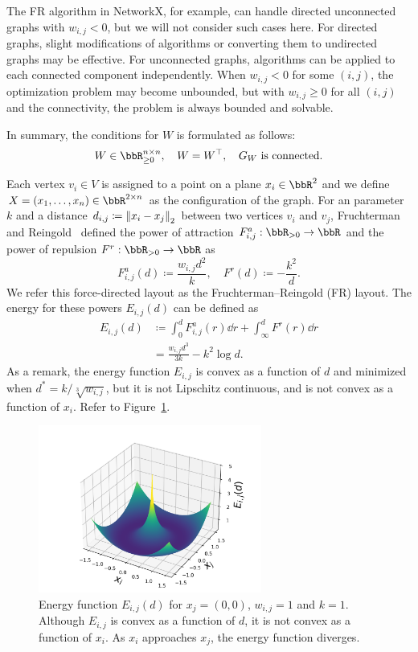 \documentclass[dvipdfmx,journal]{IEEEtran}
\newcommand{\defeq}{\coloneqq}
\begin{document}
The FR algorithm in NetworkX, for example, can handle directed unconnected graphs with $w_{i,j} < 0$, but we will not consider such cases here.
For directed graphs, slight modifications of algorithms or converting them to undirected graphs may be effective. For unconnected graphs, algorithms can be applied to each connected component independently. When $w_{i,j} < 0$ for some $(i,j)$, the optimization problem may become unbounded, but with $w_{i,j} \geq 0$ for all $(i,j)$ and the connectivity, the problem is always bounded and solvable.

In summary, the conditions for $W$ is formulated as follows:
\begin{equation}\label{eq:WCondition}
  W \in \bbR_{\geq 0}^{n \times n}, \quad W = W^\top, \quad \text{$G_W$ is connected}.
\end{equation}

Each vertex $v_i \in V$ is assigned to a point on a plane $x_i \in \bbR^2$ and we define $X = (x_1, \dots, x_n) \in \bbR^{2 \times n}$ as the configuration of the graph.
For an parameter $k$ and a distance $d_{i,j} \defeq \norm{x_i - x_j}_2$ between two vertices $v_i$ and $v_j$, Fruchterman and Reingold~\cite{fruchtermanGraphDrawingForcedirected1991} defined the power of attraction $F_{i,j}^a: \bbR_{> 0} \to \bbR$ and the power of repulsion $F^r: \bbR_{> 0} \to \bbR$ as
\begin{equation*}
  F_{i,j}^a(d) \defeq \frac{w_{i,j} d^2}{k}, \quad F^r(d) \defeq -\frac{k^2}{d}.
\end{equation*}
We refer this force-directed layout as the Fruchterman--Reingold (FR) layout.
The energy for these powers $E_{i,j}(d)$ can be defined as
\begin{align*}
  E_{i,j}(d) & \defeq \int_{0}^{d} F_{i,j}^a(r) \dd{r} + \int_{\infty}^{d} F^r(r) \dd{r} \\
             & = \frac{w_{i,j} d^3}{3k} - k^2\log{d}.
\end{align*}
As a remark, the energy function $E_{i,j}$ is convex as a function of $d$ and minimized when $d^* = k/\sqrt[3]{w_{i,j}}$, but it is not Lipschitz continuous, and is not convex as a function of $x_i$. Refer to Figure~\ref{fig:energy3d}.

\begin{figure}[t]
  \centering
  \includegraphics[height=5.5cm]{energy_3d.png}
  \caption{Energy function $E_{i,j}(d)$ for $x_j=(0,0)$, $w_{i,j} = 1$ and $k = 1$. Although $E_{i,j}$ is convex as a function of $d$, it is not convex as a function of $x_i$. As $x_i$ approaches $x_j$, the energy function diverges.}
  \label{fig:energy3d}
\end{figure}
\end{document}
